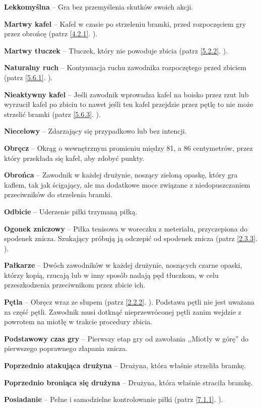 \documentclass[11pt,a4paper]{article}
\newcommand{\myref}[1]{\ref{#1}. \nameref{#1}}
\begin{document}
\textbf{Lekkomyślna} -- Gra bez przemyślenia skutków swoich akcji.

\textbf{Martwy kafel} -- Kafel w czasie po strzeleniu bramki, przed rozpoczęciem gry przez obrońcę (patrz \myref{4.2.1}).

\textbf{Martwy tłuczek} -- Tłuczek, który nie powoduje zbicia (patrz \myref{5.2.2}).

\textbf{Naturalny ruch} -- Kontynuacja ruchu zawodnika rozpoczętego przed zbiciem (patrz \myref{5.6.1}).

\textbf{Nieaktywny kafel} -- Jeśli zawodnik wprowadza kafel na boisko przez rzut lub wyrzucił kafel po zbiciu to nawet jeśli ten kafel przejdzie przez pętlę to nie może strzelić bramki (patrz \myref{5.6.3}).

\textbf{Niecelowy} -- Zdarzający się przypadkowo lub bez intencji.

\textbf{Obręcz} -- Okrąg o wewnętrznym promieniu między 81, a 86 centymetrów, przez który przekłada się kafel, aby zdobyć punkty.

\textbf{Obrońca} -- Zawodnik w każdej drużynie, noszący zieloną opaskę, który gra kaflem, tak jak ścigający, ale ma dodatkowe moce związane z niedopuszczaniem przeciwników do strzelenia bramki.

\textbf{Odbicie} -- Uderzenie piłki trzymaną piłką.

\textbf{Ogonek zniczowy} -- Piłka tenisowa w woreczku z meteriału, przyczepiona do spodenek znicza. Szukający próbują ją odczepić od spodenek znicza (patrz \myref{2.3.3}).

\textbf{Pałkarze} -- Dwóch zawodników w każdej drużynie, noszących czarne opaski, którzy kopią, rzucają lub w inny sposób nadają pęd tłuczkom, w celu przeszkodzenia przeciwnikom przez zbicie ich.

\textbf{Pętla} -- Obręcz wraz ze słupem (patrz \myref{2.2.2}). Podstawa pętli nie jest uważana za część pętli. Zawodnik musi dotknąć nieprzewróconej pętli zanim wejdzie z powrotem na miotłę w trakcie procedury zbicia.

\textbf{Podstawowy czas gry} -- Pierwszy etap gry od zawołania ,,Miotły w górę'' do pierwszego poprawnego złapania znicza.

\textbf{Poprzednio atakująca drużyna} -- Drużyna, która właśnie strzeliła bramkę.

\textbf{Poprzednio broniąca się drużyna} -- Drużyna, która właśnie straciła bramkę.

\textbf{Posiadanie} -- Pełne i samodzielne kontrolowanie piłki (patrz \myref{7.1.1}).
\end{document}
